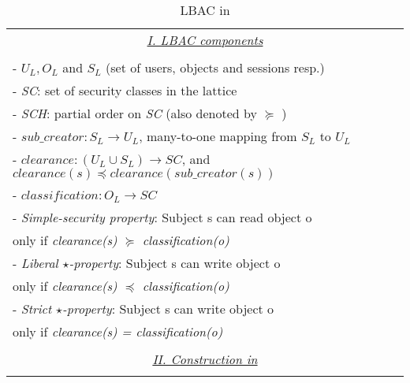 \newcommand{\userLBAC}{U_{L}}
\newcommand{\objectLBAC}{O_{L}}
\newcommand{\sessionLBAC}{S_{L}}
\newcommand{\sessionUser}{sub\_creator}
\newcommand{\clearance}{clearance}
\newcommand{\classification}{classification}

\begin{table}
	\centering
	\caption{ LBAC in \labacOneOneOne{}} %
	\label{tab:lbac-in-labac}
	\begin{tabular}{|l|}						
		\hline					
		\multicolumn{1}{|c|}{\underline{\textit{I. LBAC components }}}\\	\\			 
		 - $\userLBAC, \objectLBAC$ and $\sessionLBAC$ (set of users, objects and sessions resp.) \\
		 -  \textit{SC}:  set of security classes in the lattice \\
		 -  \textit{SCH}: partial order on \textit{SC} (also denoted by $\succeq$ ) \\
		 - $\sessionUser: \sessionLBAC \to \userLBAC$, many-to-one mapping  from $\sessionLBAC$ to $\userLBAC$\\
		 - $\clearance: (\userLBAC \cup \sessionLBAC) \to SC$,  and  $clearance(s) \preceq \clearance(\sessionUser(s))$\\
		 - $\classification: \objectLBAC \to SC$\\		
	
		 - \textit{Simple-security property}: Subject s can read object o \\ \hfill only if \textit{clearance(s) $\succeq$ classification(o)}\\
		 - \textit{Liberal $\star$-property}: Subject s can write object o\\ \hfill only if  \textit{clearance(s) $\preceq$ classification(o)}\\
		  - \textit{Strict $\star$-property}: Subject s can write object o\\ \hfill only if  \textit{clearance(s) = classification(o)}\\
		  
		  	\\	  \multicolumn{1}{|c|}{\underline{\textit{II. Construction in \labacOneOneOne{} }}} \\ \\
		  

\end{tabular}
\end{table}
